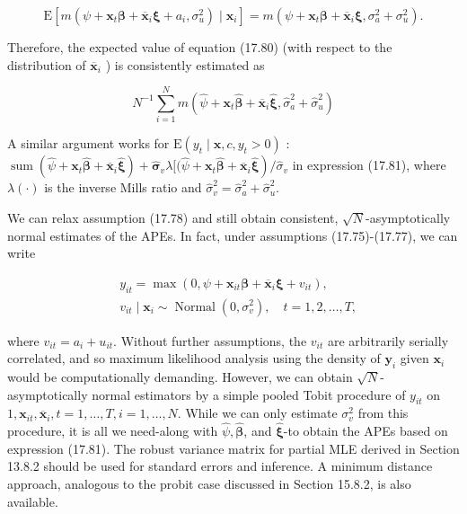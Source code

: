 \documentclass[10pt]{article}
\begin{document}
\begin{equation*}
\mathrm{E}\left[m\left(\psi+\mathbf{x}_{t} \boldsymbol{\beta}+\overline{\mathbf{x}}_{i} \boldsymbol{\xi}+a_{i}, \sigma_{u}^{2}\right) \mid \mathbf{x}_{i}\right]=m\left(\psi+\mathbf{x}_{t} \boldsymbol{\beta}+\overline{\mathbf{x}}_{i} \boldsymbol{\xi}, \sigma_{a}^{2}+\sigma_{u}^{2}\right) . \tag{17.80}
\end{equation*}


Therefore, the expected value of equation (17.80) (with respect to the distribution of $\overline{\mathbf{x}}_{i}$ ) is consistently estimated as


\begin{equation*}
N^{-1} \sum_{i=1}^{N} m\left(\hat{\psi}+\mathbf{x}_{t} \hat{\boldsymbol{\beta}}+\overline{\mathbf{x}}_{i} \hat{\boldsymbol{\xi}}, \hat{\sigma}_{a}^{2}+\hat{\sigma}_{u}^{2}\right) \tag{17.81}
\end{equation*}


A similar argument works for $\mathrm{E}\left(y_{t} \mid \mathbf{x}, c, y_{t}>0\right)$ : $\operatorname{sum}\left(\hat{\psi}+\mathbf{x}_{t} \hat{\boldsymbol{\beta}}+\overline{\mathbf{x}}_{i} \hat{\boldsymbol{\xi}}\right)+\hat{\boldsymbol{\sigma}}_{v} \lambda[(\hat{\psi}+ \left.\mathbf{x}_{t} \hat{\boldsymbol{\beta}}+\overline{\mathbf{x}}_{i} \hat{\boldsymbol{\xi}}\right) / \hat{\sigma}_{v}$ in expression (17.81), where $\lambda(\cdot)$ is the inverse Mills ratio and $\hat{\sigma}_{v}^{2}= \hat{\sigma}_{a}^{2}+\hat{\sigma}_{u}^{2}$.

We can relax assumption (17.78) and still obtain consistent, $\sqrt{N}$-asymptotically normal estimates of the APEs. In fact, under assumptions (17.75)-(17.77), we can write


\begin{align*}
& y_{i t}=\max \left(0, \psi+\mathbf{x}_{i t} \boldsymbol{\beta}+\overline{\mathbf{x}}_{i} \boldsymbol{\xi}+v_{i t}\right),  \tag{17.82}\\
& v_{i t} \mid \mathbf{x}_{i} \sim \operatorname{Normal}\left(0, \sigma_{v}^{2}\right), \quad t=1,2, \ldots, T, \tag{17.83}
\end{align*}


where $v_{i t}=a_{i}+u_{i t}$. Without further assumptions, the $v_{i t}$ are arbitrarily serially correlated, and so maximum likelihood analysis using the density of $\mathbf{y}_{i}$ given $\mathbf{x}_{i}$ would be computationally demanding. However, we can obtain $\sqrt{N}$-asymptotically normal estimators by a simple pooled Tobit procedure of $y_{i t}$ on $1, \mathbf{x}_{i t}, \overline{\mathbf{x}}_{i}, t=1, \ldots, T, i= 1, \ldots, N$. While we can only estimate $\sigma_{v}^{2}$ from this procedure, it is all we need-along with $\hat{\psi}, \hat{\boldsymbol{\beta}}$, and $\hat{\boldsymbol{\xi}}$-to obtain the APEs based on expression (17.81). The robust variance matrix for partial MLE derived in Section 13.8.2 should be used for standard errors and inference. A minimum distance approach, analogous to the probit case discussed in Section 15.8.2, is also available.
\end{document}
